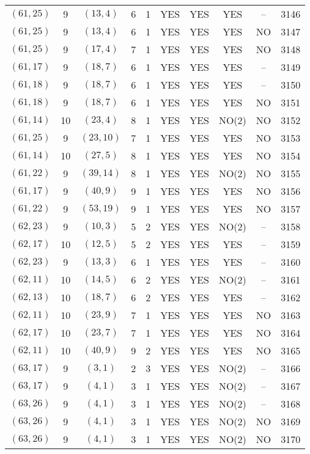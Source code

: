 \begin{longtable}{|c|c|c|c|c|c|c|c|c|c|}
$(61, 25)$ & 9 & $(13, 4)$ & 6 & 1 & YES & YES & YES & -- & 3146\\
$(61, 25)$ & 9 & $(13, 4)$ & 6 & 1 & YES & YES & YES & NO & 3147\\
$(61, 25)$ & 9 & $(17, 4)$ & 7 & 1 & YES & YES & YES & NO & 3148\\
$(61, 17)$ & 9 & $(18, 7)$ & 6 & 1 & YES & YES & YES & -- & 3149\\
$(61, 18)$ & 9 & $(18, 7)$ & 6 & 1 & YES & YES & YES & -- & 3150\\
$(61, 18)$ & 9 & $(18, 7)$ & 6 & 1 & YES & YES & YES & NO & 3151\\
$(61, 14)$ & 10 & $(23, 4)$ & 8 & 1 & YES & YES & NO(2) & NO & 3152\\
$(61, 25)$ & 9 & $(23, 10)$ & 7 & 1 & YES & YES & YES & NO & 3153\\
$(61, 14)$ & 10 & $(27, 5)$ & 8 & 1 & YES & YES & YES & NO & 3154\\
$(61, 22)$ & 9 & $(39, 14)$ & 8 & 1 & YES & YES & NO(2) & NO & 3155\\
$(61, 17)$ & 9 & $(40, 9)$ & 9 & 1 & YES & YES & YES & NO & 3156\\
$(61, 22)$ & 9 & $(53, 19)$ & 9 & 1 & YES & YES & YES & NO & 3157\\
$(62, 23)$ & 9 & $(10, 3)$ & 5 & 2 & YES & YES & NO(2) & -- & 3158\\
$(62, 17)$ & 10 & $(12, 5)$ & 5 & 2 & YES & YES & YES & -- & 3159\\
$(62, 23)$ & 9 & $(13, 3)$ & 6 & 1 & YES & YES & YES & -- & 3160\\
$(62, 11)$ & 10 & $(14, 5)$ & 6 & 2 & YES & YES & NO(2) & -- & 3161\\
$(62, 13)$ & 10 & $(18, 7)$ & 6 & 2 & YES & YES & YES & -- & 3162\\
$(62, 11)$ & 10 & $(23, 9)$ & 7 & 1 & YES & YES & YES & NO & 3163\\
$(62, 17)$ & 10 & $(23, 7)$ & 7 & 1 & YES & YES & YES & NO & 3164\\
$(62, 11)$ & 10 & $(40, 9)$ & 9 & 2 & YES & YES & YES & NO & 3165\\
$(63, 17)$ & 9 & $(3, 1)$ & 2 & 3 & YES & YES & NO(2) & -- & 3166\\
$(63, 17)$ & 9 & $(4, 1)$ & 3 & 1 & YES & YES & NO(2) & -- & 3167\\
$(63, 26)$ & 9 & $(4, 1)$ & 3 & 1 & YES & YES & NO(2) & -- & 3168\\
$(63, 26)$ & 9 & $(4, 1)$ & 3 & 1 & YES & YES & NO(2) & NO & 3169\\
$(63, 26)$ & 9 & $(4, 1)$ & 3 & 1 & YES & YES & NO(2) & NO & 3170\\

\end{longtable}
